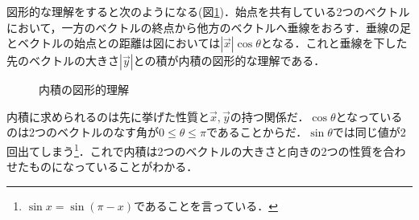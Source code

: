     図形的な理解をすると次のようになる(図\ref{fig:vector_naiseki2})．始点を共有している2つのベクトルにおいて，一方のベクトルの終点から他方のベクトルへ垂線をおろす．垂線の足とベクトルの始点との距離は図においては$|\vec{x}|\cos\theta$となる．これと垂線を下した先のベクトルの大きさ$|\vec{y}|$との積が内積の図形的な理解である．
    \begin{figure}[htbp]
        \begin{center}
        \end{center}
        \caption{内積の図形的理解}
        \label{fig:vector_naiseki2}
    \end{figure}




    内積に求められるのは先に挙げた性質と$\vec{x},\vec{y}$の持つ関係だ．$\cos\theta$となっているのは2つのベクトルのなす角が$0\leq\theta\leq\pi$であることからだ．$\sin\theta$では同じ値が2回出てしまう\footnote{$\sin x=\sin (\pi -x)$であることを言っている．}．これで内積は2つのベクトルの大きさと向きの2つの性質を合わせたものになっていることがわかる．

